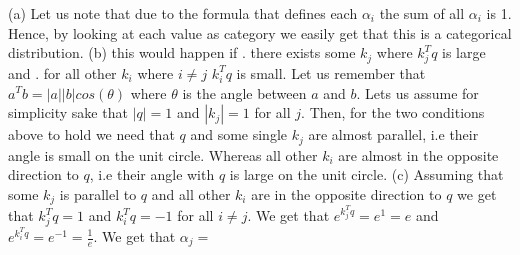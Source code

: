 (a) \newline
Let us note that due to the formula that defines each $\alpha_i$ the sum of all $\alpha_i$ is 1. 
Hence, by looking at each value as category we easily get that this is a categorical distribution. \newline
(b) \newline
this would happen if . there exists some $k_j$ where $k_j^Tq$ is large and . for all other $k_i$ where $i \neq j$ $k_i^Tq$ is small. \newline
Let us remember that $a^Tb = |a||b|cos(\theta)$ where $\theta$ is the angle between $a$ and $b$. Lets us assume for simplicity sake that $|q| = 1$ and $|k_j| = 1$ for all $j$. \newline
Then, for the two conditions above to hold we need that $q$ and some single $k_j$ are almost parallel, i.e their angle is small on the unit circle. 
Whereas all other $k_i$ are almost in the opposite direction to $q$, i.e their angle with $q$ is large on the unit circle. \newline
(c) \newline
Assuming that some $k_j$ is parallel to $q$ and all other $k_i$ are in the opposite direction to $q$ we get that $k_j^Tq = 1$ and $k_i^Tq = -1$ for all $i \neq j$. \newline
We get that $e^{k_j^Tq} = e^1 = e$ and $e^{k_i^Tq} = e^{-1} = \frac{1}{e}$. \newline
We get that $\alpha_j=$